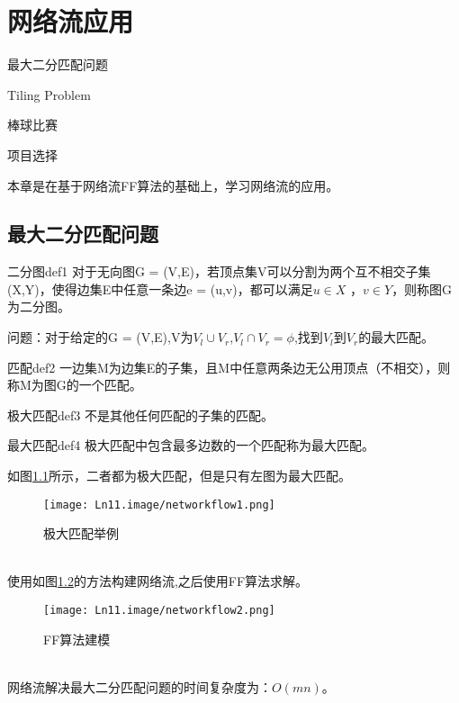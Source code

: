 \chapter{网络流应用}

\begin{introduction}
\item 最大二分匹配问题
\item Tiling Problem
\item 棒球比赛
\item 项目选择
\end{introduction}

本章是在基于网络流FF算法的基础上，学习网络流的应用。

\section{最大二分匹配问题}

\begin{definition}{二分图}{def1}
    对于无向图G = (V,E)，若顶点集V可以分割为两个互不相交子集(X,Y)，使得边集E中任意一条边e = (u,v)，都可以满足\(u \in X\) ，\(v \in Y\)，则称图G为二分图。
\end{definition}

问题：对于给定的G = (V,E),V为\(V_l \cup V_r\),\(V_l \cap V_r = \phi\),找到\(V_l\)到\(V_r\)的最大匹配。

\begin{definition}{匹配}{def2}
    一边集M为边集E的子集，且M中任意两条边无公用顶点（不相交），则称M为图G的一个匹配。
\end{definition}

\begin{definition}{极大匹配}{def3}
    不是其他任何匹配的子集的匹配。
\end{definition}

\begin{definition}{最大匹配}{def4}
    极大匹配中包含最多边数的一个匹配称为最大匹配。
\end{definition}

如图\ref{fig1}所示，二者都为极大匹配，但是只有左图为最大匹配。
\begin{figure}[htb]
  \centering
  \texttt{[image: Ln11.image/networkflow1.png]}
  \caption{极大匹配举例}\label{fig1}
\end{figure}
\\使用如图\ref{fig2}的方法构建网络流,之后使用FF算法求解。
\begin{figure}[htb]
  \centering
  \texttt{[image: Ln11.image/networkflow2.png]}
  \caption{FF算法建模}\label{fig2}
\end{figure}
\\网络流解决最大二分匹配问题的时间复杂度为：\(O(mn)\)。

